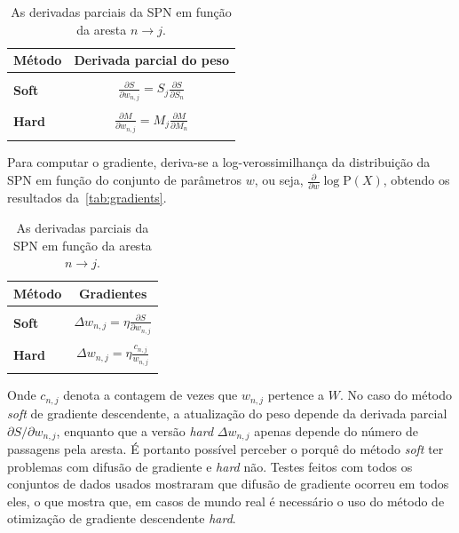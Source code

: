 \documentclass[12pt]{article}
\theoremstyle{plain}
\numberwithin{equation}{section}
\newcommand{\pr}{\text{P}}
\newcommand{\ddspn}[2]{\frac{\partial#1}{\partial#2}}
\newcommand{\iddspn}[2]{\partial#1/\partial#2}
\begin{document}
\begin{table}[h]
  \centering
  \begin{tabular}{l|c}
    \hline
    \multicolumn{1}{c}{\bfseries Método} & \multicolumn{1}{c}{\bfseries Derivada parcial do peso}\\
    \hline & \\
    \textbf{Soft} & \(\displaystyle \ddspn{S}{w_{n,j}} = S_j\ddspn{S}{S_n} \) \\
    & \\
    \textbf{Hard} & \(\displaystyle \ddspn{M}{w_{n,j}} = M_j\ddspn{M}{M_n} \) \\
    & \\
    \hline
  \end{tabular}
  \caption{\label{tab:derivative-weight} As derivadas parciais da SPN em função da aresta $n\to j$.}
\end{table}

Para computar o gradiente, deriva-se a log-verossimilhança da distribuição da SPN em função do
conjunto de parâmetros $w$, ou seja, $\ddspn{}{w}\log\pr(X)$, obtendo os resultados
da~\autoref{tab:gradients}.

\begin{table}[H]
  \centering
  \begin{tabular}{l|c}
    \hline
    \multicolumn{1}{c}{\bfseries Método} & \multicolumn{1}{c}{\bfseries Gradientes}\\
    \hline & \\
    \textbf{Soft} & \(\displaystyle \Delta w_{n,j} = \eta\ddspn{S}{w_{n,j}} \) \\
    & \\
    \textbf{Hard} & \(\displaystyle \Delta w_{n,j} = \eta \frac{c_{n,j}}{w_{n,j}} \) \\
    & \\
    \hline
  \end{tabular}
  \caption{\label{tab:derivative-weight} As derivadas parciais da SPN em função da aresta $n\to j$.}
\end{table}

Onde $c_{n,j}$ denota a contagem de vezes que $w_{n,j}$ pertence a $W$. No caso do método
\textit{soft} de gradiente descendente, a atualização do peso depende da derivada parcial
$\iddspn{S}{w_{n,j}}$, enquanto que a versão \textit{hard} $\Delta w_{n,j}$ apenas depende do
número de passagens pela aresta. É portanto possível perceber o porquê do método \textit{soft}
ter problemas com difusão de gradiente e \textit{hard} não. Testes feitos com todos os conjuntos de
dados usados mostraram que difusão de gradiente ocorreu em todos eles, o que mostra que, em
casos de mundo real é necessário o uso do método de otimização de gradiente descendente
\textit{hard}.
\end{document}
